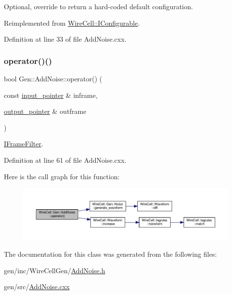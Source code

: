 Optional, override to return a hard-\/coded default configuration. 



Reimplemented from \hyperlink{class_wire_cell_1_1_i_configurable_a54841b2da3d1ea02189478bff96f7998}{Wire\+Cell\+::\+I\+Configurable}.



Definition at line 33 of file Add\+Noise.\+cxx.

\mbox{\label{class_wire_cell_1_1_gen_1_1_add_noise_aa5bdb418d61bfb70d1507bd4b1798d53}} 
\subsubsection{\texorpdfstring{operator()()}{operator()()}}
{\footnotesize\ttfamily bool Gen\+::\+Add\+Noise\+::operator() (\begin{DoxyParamCaption}\item[{const \hyperlink{class_wire_cell_1_1_i_function_node_a55c0946156df9b712b8ad1a0b59b2db6}{input\+\_\+pointer} \&}]{inframe,  }\item[{\hyperlink{class_wire_cell_1_1_i_function_node_afc02f1ec60d31aacddf64963f9ca650b}{output\+\_\+pointer} \&}]{outframe }\end{DoxyParamCaption})\hspace{0.3cm}{\ttfamily [virtual]}}



\hyperlink{class_wire_cell_1_1_i_frame_filter}{I\+Frame\+Filter}. 



Definition at line 61 of file Add\+Noise.\+cxx.

Here is the call graph for this function\+:
\nopagebreak
\begin{figure}[H]
\begin{center}
\leavevmode
\includegraphics[width=350pt]{class_wire_cell_1_1_gen_1_1_add_noise_aa5bdb418d61bfb70d1507bd4b1798d53_cgraph}
\end{center}
\end{figure}


The documentation for this class was generated from the following files\+:\begin{DoxyCompactItemize}
\item 
gen/inc/\+Wire\+Cell\+Gen/\hyperlink{_add_noise_8h}{Add\+Noise.\+h}\item 
gen/src/\hyperlink{_add_noise_8cxx}{Add\+Noise.\+cxx}\end{DoxyCompactItemize}
